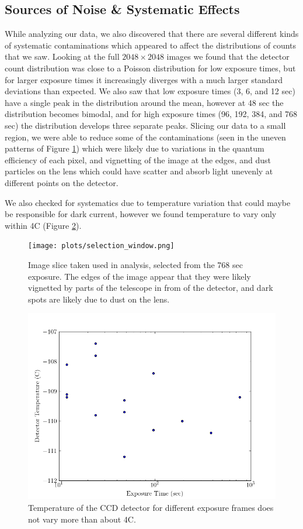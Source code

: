 \documentclass[preprint]{aastex62}
\begin{document}
\subsection{Sources of Noise \& Systematic Effects} \label{subsec:systematics}
While analyzing our data, we also discovered that there are several different kinds of systematic contaminations which appeared to affect the distributions of counts that we saw. Looking at the full $2048\times2048$ images we found that the detector count distribution was close to a Poisson distribution for low exposure times, but for larger exposure times it increasingly diverges with a much larger standard deviations than expected. We also saw that low exposure times (3, 6, and 12 sec) have a single peak in the distribution around the mean, however at 48 sec the distribution becomes bimodal, and for high exposure times (96, 192, 384, and 768 sec) the distribution develops three separate peaks. Slicing our data to a small region, we were able to reduce some of the contaminations (seen in the uneven patterns of Figure \ref{fig:slice}) which were likely due to variations in the quantum efficiency of each pixel, and vignetting of the image at the edges, and dust particles on the lens which could have scatter and absorb light unevenly at different points on the detector.

We also checked for systematics due to temperature variation that could maybe be responsible for dark current, however we found temperature to vary only within 4C (Figure \ref{fig:temp}). 

\begin{figure}[H]
\begin{center}
\texttt{[image: plots/selection\_window.png]}
\caption{Image slice taken used in analysis, selected from the 768 sec exposure. The edges of the image appear that they were likely vignetted by parts of the telescope in from of the detector, and dark spots are likely due to dust on the lens.} \label{fig:slice}
\end{center}
\end{figure}


\begin{figure}[H]
\begin{center}
\includegraphics[width=.48\linewidth]{plots/exposure_temp.png}
\caption{Temperature of the CCD detector for different exposure frames does not vary more than about 4C.} \label{fig:temp}
\end{center}
\end{figure}
\end{document}
